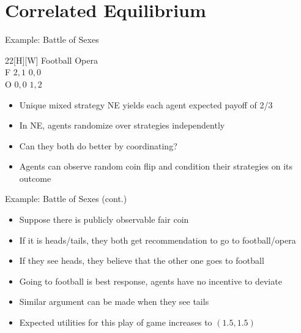 \documentclass[11pt,aspectratio=169,handout]{beamer}
\begin{document}
 \section{Correlated Equilibrium}
  \begin{frame}{Example: Battle of Sexes}
   \begin{center}
    \hspace{-9.8em}
    \begin{game}{2}{2}[H][W]
      	\> Football		\> Opera		\\
     F	\> $2, 1$		\> $0, 0$	\\
     O	\> $0, 0$		\> $1, 2$
    \end{game}
   \end{center}
   \vspace{1em}
   \begin{itemize}[<+->]
   	\item Unique mixed strategy NE yields each agent expected payoff of 2/3
    \item In NE, agents randomize over strategies \alert{independently}
    \item Can they both do better by coordinating?
    \item Agents can observe random coin flip and condition their strategies on its outcome
   \end{itemize}
  \end{frame}

  \begin{frame}{Example: Battle of Sexes (cont.)}
   \begin{itemize}[<+->]
   \setlength{\itemsep}{1.1em}
    \item Suppose there is \alert{publicly observable} fair coin
    \item If it is heads/tails, they both get \alert{recommendation} to go to football/opera
    \item If they see heads, they believe that the other one goes to football
    \item Going to football is best response, agents have \alert{no incentive to deviate}
    \item Similar argument can be made when they see tails
    \item Expected utilities for this play of game \alert{increases} to $(1.5, 1.5)$
   \end{itemize}
  \end{frame}
  
\end{document}
